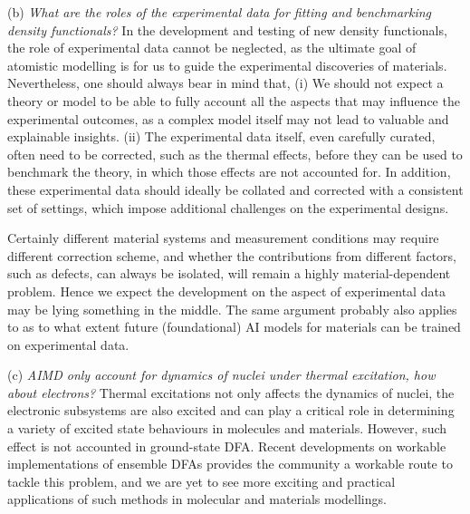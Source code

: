 (b) \emph{What are the roles of the experimental data for fitting and benchmarking density functionals?} %
In the development and testing of new density functionals, the role of experimental data cannot be neglected, as the ultimate goal of atomistic modelling is for us to guide the experimental discoveries of materials. Nevertheless, one should always bear in mind that, (i) We should not expect a theory or model to be able to fully account all the aspects that may influence the experimental outcomes, as a complex model itself may not lead to valuable and explainable insights. (ii) The experimental data itself, even carefully curated, often need to be corrected, such as the thermal effects,\cite{otero2012benchmark} before they can be used to benchmark the theory, in which those effects are not accounted for. In addition, these experimental data should ideally be collated and corrected with a consistent set of settings, which  impose additional challenges on the experimental designs. 

Certainly different material systems and measurement conditions may require different correction scheme, and whether the contributions from different factors, such as defects, can always be isolated, will remain a highly material-dependent problem. Hence we expect the development on the aspect of experimental data may be lying something in the middle. The same argument  probably also applies to as to what extent future (foundational) AI models for materials can be trained on experimental data.

(c) \emph{AIMD only account for dynamics of nuclei under thermal excitation, how about electrons?} Thermal excitations not only affects the dynamics of nuclei, the electronic subsystems are also excited and can play a critical role in determining a variety of excited state behaviours in molecules and materials. However, such effect is not accounted in ground-state DFA. Recent developments on workable implementations of ensemble DFAs\cite{valone1980one} provides the community a workable route to tackle this problem, and we are yet to see more exciting and practical applications of such methods in molecular and materials modellings.


